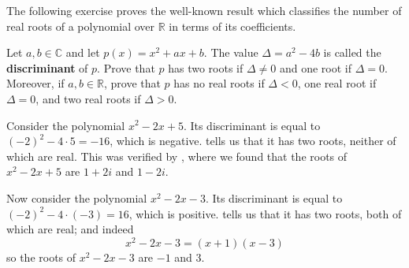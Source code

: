 The following exercise proves the well-known result which classifies the number of real roots of a polynomial over $\mathbb{R}$ in terms of its coefficients.

\begin{exercise}
\label{exDiscriminantRealRoots}
Let $a,b \in \mathbb{C}$ and let $p(x)=x^2+ax+b$. The value $\Delta=a^2-4b$ is called the \textbf{discriminant} of $p$. Prove that $p$ has two roots if $\Delta \ne 0$ and one root if $\Delta = 0$. Moreover, if $a,b \in \mathbb{R}$, prove that $p$ has no real roots if $\Delta < 0$, one real root if $\Delta = 0$, and two real roots if $\Delta > 0$.
\end{exercise}

\begin{example}
Consider the polynomial $x^2-2x+5$. Its discriminant is equal to $(-2)^2-4 \cdot 5 = -16$, which is negative.  tells us that it has two roots, neither of which are real. This was verified by , where we found that the roots of $x^2-2x+5$ are $1+2i$ and $1-2i$.

Now consider the polynomial $x^2-2x-3$. Its discriminant is equal to $(-2)^2-4\cdot(-3) = 16$, which is positive.  tells us that it has two roots, both of which are real; and indeed
\[ x^2-2x-3 = (x+1)(x-3) \]
so the roots of $x^2-2x-3$ are $-1$ and $3$.
\end{example}


\chexend